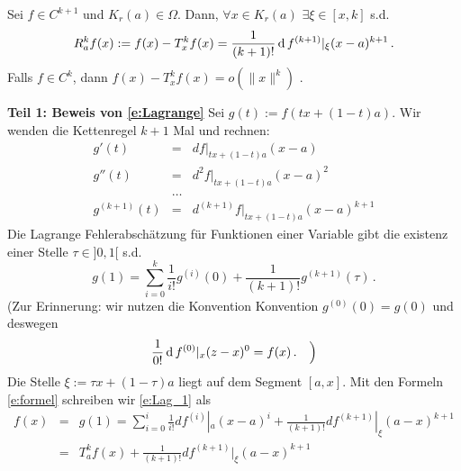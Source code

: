 \begin{Sat}\label{s:Lag}
Sei $f\in C^{k+1}$ und $K_r (a)\in \Omega$. Dann, $\forall x\in K_r (a)$ $\exists \xi\in [x,k]$ s.d.
\begin{equation}\label{e:Lagrange}
R^k_a f (x) := f(x) - T^k_x f (x) = \frac{1}{(k+1)!}\operatorname{d} f^{(k+1)}|_\xi (x-a)^{k+1}\, .
\end{equation}
Falls $f\in C^k$, dann $f(x) - T^k_x f(x) = o (\|x\|^k)$ .
\end{Sat}
\begin{Bew}
{\bf Teil 1: Beweis von \eqref{e:Lagrange}} Sei $g (t) := f(tx + (1-t)a)$. Wir wenden die Kettenregel
$k+1$ Mal und rechnen:
\begin{eqnarray}
g' (t) &=& df|_{tx + (1-t)a} (x-a)\nonumber\\
g''(t) &=& d^2f|_{tx + (1-t)a} (x-a)^2\nonumber\\
&\ldots&\label{e:formel}\\
g^{(k+1)} (t) &=& d^{(k+1)} f|_{tx + (1-t)a} (x-a)^{k+1}\nonumber
\end{eqnarray}
Die Lagrange Fehlerabsch\"atzung f\"ur Funktionen einer Variable gibt
die existenz einer Stelle $\tau\in ]0,1[$ s.d.
\begin{equation}\label{e:Lag_1}
g(1) = \sum_{i=0}^k \frac{1}{i!} g^{(i)} (0) + \frac{1}{(k+1)!} g^{(k+1)} (\tau)\, .
\end{equation}
(Zur Erinnerung: wir nutzen die Konvention Konvention $g^{(0)} (0) = g(0)$ und deswegen
\[\frac{1}{0!}\operatorname{d} f^{(0)}|_x(z-x)^0=f(x)\, .\quad \Big)\]
Die Stelle $\xi:= \tau x + (1-\tau) a$ liegt auf dem Segment $[a,x]$. Mit den Formeln
\eqref{e:formel} schreiben wir \eqref{e:Lag_1} als
\begin{eqnarray*}
f(x) &=& g(1)=  \sum_{i=0}^i \frac{1}{i!} df^{(i)}|_a (x-a)^i + \frac{1}{(k+1)!} df^{(k+1)}|_\xi (a-x)^{k+1}\\
&=& T^k_a f (x) +  \frac{1}{(k+1)!} df^{(k+1)}|_\xi (a-x)^{k+1}
\end{eqnarray*}

\medskip


\end{Bew}
